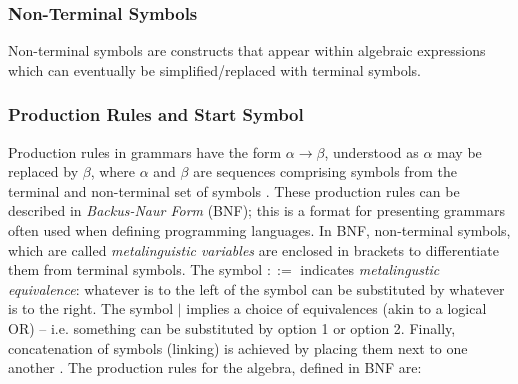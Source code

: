 \subsubsection{Non-Terminal Symbols}
Non-terminal symbols are constructs that appear within algebraic expressions which can eventually be simplified/replaced with terminal symbols.

\begin{table}[!ht]
    \centering
    \caption{Non-Terminal Symbols}
    \label{tab:nonterminals}
\end{table}

\subsubsection{Production Rules and Start Symbol}
Production rules in grammars have the form $\alpha \rightarrow \beta$, understood as $\alpha$ may be replaced by $\beta$, where $\alpha$ and $\beta$ are sequences comprising symbols from the terminal and non-terminal set of symbols \cite{jäger_rogers_2012}. These production rules can be described in \textit{Backus-Naur Form} (BNF); this is a format for presenting grammars often used when defining programming languages. In BNF, non-terminal symbols, which are called \textit{metalinguistic variables} are enclosed in brackets to differentiate them from terminal symbols. The symbol $::=$ indicates \textit{metalingustic equivalence}: whatever is to the left of the symbol can be substituted by whatever is to the right. The symbol $|$ implies a choice of equivalences (akin to a logical OR) -- i.e. something can be substituted by option 1 or option 2. Finally, concatenation of symbols (linking) is achieved by placing them next to one another \cite{bnf}. The production rules for the algebra, defined in BNF are: 

